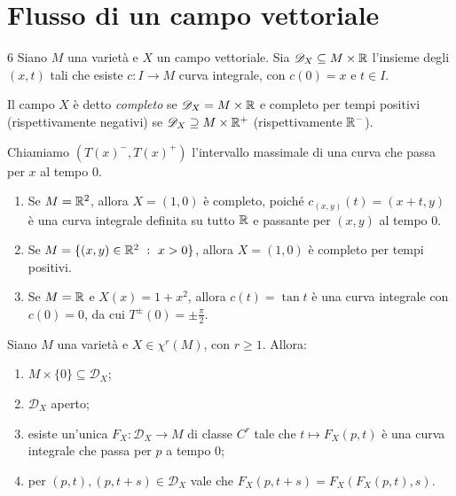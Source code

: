 \section{Flusso di un campo vettoriale} %

\begin{definition}   6
	Siano $M$ una varietà e $X$ un campo vettoriale. Sia $\mathscr D_X\subseteq M\times \mathbb R$ l'insieme degli $(x,t)$ tali che esiste $c:I\to M$ curva integrale, con $c(0)=x$ e $t \in I$.
	
	Il campo $X$ è detto \emph{completo} se $\mathscr D_X=M\times \mathbb R$ e completo per tempi positivi (rispettivamente negativi) se $\mathscr D_X\supseteq M\times\mathbb R^+$ (rispettivamente $\mathbb R^-$).
	
	Chiamiamo $(T(x)^-,T(x)^+)$ l'intervallo massimale di una curva che passa per $x$ al tempo 0. 
\end{definition}

\begin{example}
\begin{enumerate}
	\item Se $M=\mathbb R^2$, allora $X=(1,0)$ è completo, poiché $c_{(x,y)}(t)=(x+t,y)$ è una curva integrale definita su tutto $\mathbb R$ e passante per $(x,y)$ al tempo 0.
	\item Se $M=\{(x,y) \in \mathbb R^2 \ :\  x>0\}$, allora $X=(1,0)$ è completo per tempi positivi.
	\item Se $M=\mathbb R$ e $X(x)=1+x^2$, allora $c(t)=\tan t$ è una curva integrale con $c(0)=0$, da cui $T^\pm(0)=\pm \frac \pi 2$.
\end{enumerate}
\end{example}

\begin{proposition} \label{prop:ProprietaDX}
	Siano $M$ una varietà e $X\in \chi^r(M)$, con $r\ge 1$. Allora:
	\begin{enumerate}
	 \item $M\times\{0\}\subseteq \mathscr D_X$; \label{PDX:ContieneM}
	 \item $\mathscr D_X$ aperto; \label{PDX:Aperto}
	 \item esiste un'unica $F_X:\mathscr D_X\to M$ di classe $C^r$ tale che $t\mapsto F_X(p,t)$ è una curva integrale che passa per $p$ a tempo 0; \label{PDX:FunzioneSuDX}
	 \item per $(p,t),(p,t+s)\in\mathscr D_X$ vale che $F_X(p,t+s)=F_X(F_X(p,t),s)$. \label{PDX:Composizione}
	\end{enumerate}
\end{proposition}

